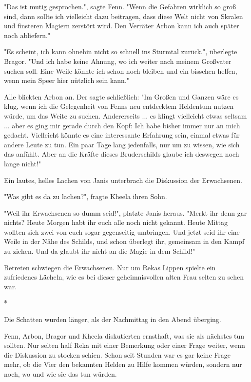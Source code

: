 \documentclass[10pt, a4paper, oneside]{book}
\begin{document}
\begin{multicols}{2}
"Das ist mutig gesprochen.", sagte Fenn. "Wenn die Gefahren wirklich so groß sind, dann sollte ich vielleicht dazu beitragen, dass diese Welt nicht von Skralen und finsteren Magiern zerstört wird. Den Verräter Arbon kann ich auch später noch abliefern." 

"Es scheint, ich kann ohnehin nicht so schnell ins Sturmtal zurück.", überlegte Bragor. "Und ich habe keine Ahnung, wo ich weiter nach meinem Großvater suchen soll. Eine Weile könnte ich schon noch bleiben und ein bisschen helfen, wenn mein Speer hier nützlich sein kann." 

Alle blickten Arbon an. Der sagte schließlich: "Im Großen und Ganzen wäre es klug, wenn ich die Gelegenheit von Fenns neu entdecktem Heldentum nutzen würde, um das Weite zu suchen. Andererseits ... es klingt vielleicht etwas seltsam ... aber es ging mir gerade durch den Kopf: Ich habe bisher immer nur an mich gedacht. Vielleicht könnte es eine interessante Erfahrung sein, einmal etwas für andere Leute zu tun. Ein paar Tage lang jedenfalls, nur um zu wissen, wie sich das anfühlt. Aber an die Kräfte dieses Bruderschilds glaube ich deswegen noch lange nicht!" 

Ein lautes, helles Lachen von Janis unterbrach die Diskussion der Erwachsenen.

"Was gibt es da zu lachen?", fragte Kheela ihren Sohn. 

"Weil ihr Erwachsenen so dumm seid!", platzte Janis heraus. "Merkt ihr denn gar nichts? Heute Morgen habt ihr euch alle noch nicht gekannt. Heute Mittag wollten sich zwei von euch sogar gegenseitig umbringen. Und jetzt seid ihr eine Weile in der Nähe des Schilds, und schon überlegt ihr, gemeinsam in den Kampf zu ziehen. Und da glaubt ihr nicht an die Magie in dem Schild!" 

Betreten schwiegen die Erwachsenen. Nur um Rekas Lippen spielte ein zufriedenes Lächeln, wie es bei dieser geheimnisvollen alten Frau selten zu sehen war. 

\begin{center}
    * 
\end{center}

Die Schatten wurden länger, als der Nachmittag in den Abend überging. 

Fenn, Arbon, Bragor und Kheela diskutierten ernsthaft, was sie als nächstes tun sollten. Nur selten half Reka mit einer Bemerkung oder einer Frage weiter, wenn die Diskussion zu stocken schien. Schon seit Stunden war es gar keine Frage mehr, ob die Vier den bekannten Helden zu Hilfe kommen würden, sondern nur noch, wo und wie sie das tun würden. 


\end{multicols}
\end{document}
